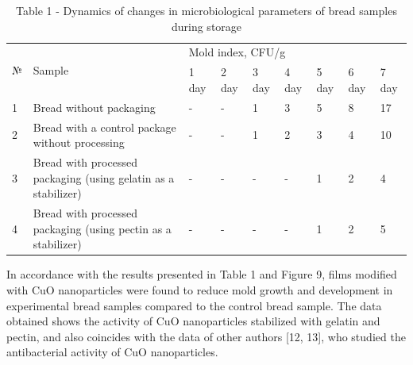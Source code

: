 \begin{table}[H]
\caption*{Table 1 - Dynamics of changes in microbiological parameters of bread samples during storage}
\centering
\begin{tabular}{|l|p{}|lllllll|}
\hline
\multirow{2}{*}{№} & \multirow{2}{*}{Sample} & \multicolumn{7}{l|}{Mold 			index, CFU/g} \\ \cline{3-9} 
 &  & \multicolumn{1}{l|}{1 			day} & \multicolumn{1}{l|}{2 			day} & \multicolumn{1}{l|}{3 			day} & \multicolumn{1}{l|}{4 			day} & \multicolumn{1}{l|}{5 			day} & \multicolumn{1}{l|}{6 			day} & 7 			day \\ \hline
1 & Bread 			without packaging & \multicolumn{1}{l|}{-} & \multicolumn{1}{l|}{-} & \multicolumn{1}{l|}{1} & \multicolumn{1}{l|}{3} & \multicolumn{1}{l|}{5} & \multicolumn{1}{l|}{8} & 17 \\ \hline
2 & Bread 			with a control package without processing & \multicolumn{1}{l|}{-} & \multicolumn{1}{l|}{-} & \multicolumn{1}{l|}{1} & \multicolumn{1}{l|}{2} & \multicolumn{1}{l|}{3} & \multicolumn{1}{l|}{4} & 10 \\ \hline
3 & Bread 			with processed packaging (using gelatin as a stabilizer) & \multicolumn{1}{l|}{-} & \multicolumn{1}{l|}{-} & \multicolumn{1}{l|}{-} & \multicolumn{1}{l|}{-} & \multicolumn{1}{l|}{1} & \multicolumn{1}{l|}{2} & 4 \\ \hline
4 & Bread 			with processed packaging (using pectin as a stabilizer) & \multicolumn{1}{l|}{-} & \multicolumn{1}{l|}{-} & \multicolumn{1}{l|}{-} & \multicolumn{1}{l|}{-} & \multicolumn{1}{l|}{1} & \multicolumn{1}{l|}{2} & 5 \\ \hline
\end{tabular}
\end{table}

\begin{multicols}{2}
In accordance with the results presented in Table 1 and Figure 9, films
modified with CuO nanoparticles were found to reduce mold growth and
development in experimental bread samples compared to the control bread
sample. The data obtained shows the activity of CuO nanoparticles
stabilized with gelatin and pectin, and also coincides with the data of
other authors {[}12, 13{]}, who studied the antibacterial activity of
CuO nanoparticles.
\end{multicols}

